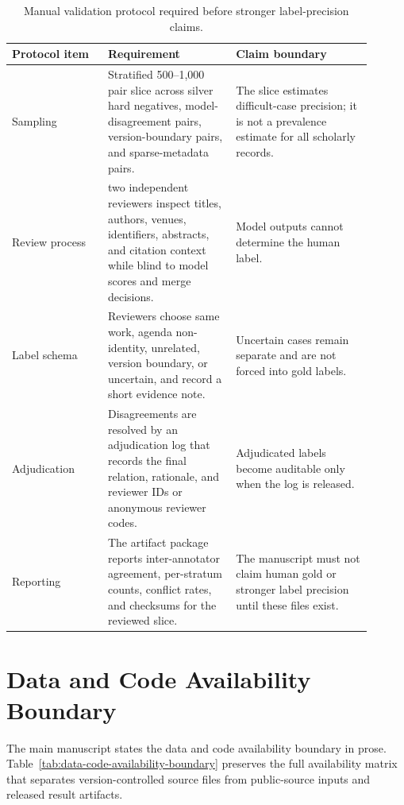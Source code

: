 \documentclass[11pt]{article}
\begin{document}
\begin{table}[H]
\caption{Manual validation protocol required before stronger label-precision claims.}
\label{tab:manual-validation-protocol}
\centering
\small
\begin{tabular}{L{0.24\linewidth}L{0.32\linewidth}L{0.34\linewidth}}
\toprule
Protocol item & Requirement & Claim boundary \\
\midrule
Sampling & Stratified 500--1,000 pair slice across silver hard negatives, model-disagreement pairs, version-boundary pairs, and sparse-metadata pairs. & The slice estimates difficult-case precision; it is not a prevalence estimate for all scholarly records. \\
Review process & two independent reviewers inspect titles, authors, venues, identifiers, abstracts, and citation context while blind to model scores and merge decisions. & Model outputs cannot determine the human label. \\
Label schema & Reviewers choose same work, agenda non-identity, unrelated, version boundary, or uncertain, and record a short evidence note. & Uncertain cases remain separate and are not forced into gold labels. \\
Adjudication & Disagreements are resolved by an adjudication log that records the final relation, rationale, and reviewer IDs or anonymous reviewer codes. & Adjudicated labels become auditable only when the log is released. \\
Reporting & The artifact package reports inter-annotator agreement, per-stratum counts, conflict rates, and checksums for the reviewed slice. & The manuscript must not claim human gold or stronger label precision until these files exist. \\
\bottomrule
\end{tabular}
\end{table}

\section{Data and Code Availability Boundary}

The main manuscript states the data and code availability boundary in prose. Table~\ref{tab:data-code-availability-boundary} preserves the full availability matrix that separates version-controlled source files from public-source inputs and released result artifacts.
\end{document}
